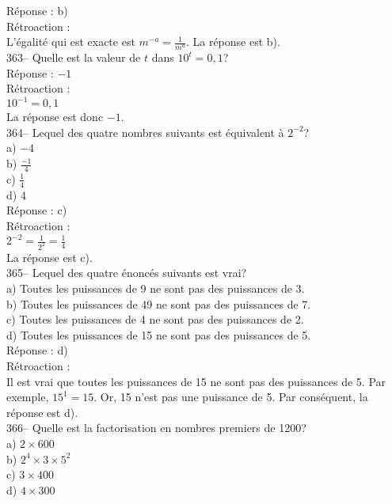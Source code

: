 ﻿\documentclass[letterpaper, 12pt]{article}
\begin{document}
R\'eponse : b)\\

R\'etroaction : \\
L'\'egalit\'e qui est exacte est $m^{-a}=\frac{1}{m^{a}}$.  La r\'eponse est
b).\\

363-- Quelle est la valeur de $t$ dans $10^{t}=0,1$?\\

R\'eponse : $-1$\\

R\'etroaction : \\
$10^{-1}=0,1$\\
La r\'eponse est donc $-1$.\\

364-- Lequel des quatre nombres suivants est \'equivalent \`a $2^{-2}$?\\
a) $-4$\\[2mm]
b) $\frac{-1}{4}$\\[2mm]
c) $\frac{1}{4}$\\[2mm]
d) 4\\

R\'eponse : c)\\

R\'etroaction : \\
$2^{-2}=\frac{1}{2^{2}}=\frac{1}{4}$\\[2mm]
La r\'eponse est c).\\

365-- Lequel des quatre \'enonc\'es suivants est vrai?\\
a) Toutes les puissances de 9 ne sont pas des puissances de 3.\\
b) Toutes les puissances de 49 ne sont pas des puissances de 7.\\
c) Toutes les puissances de 4 ne sont pas des puissances de 2.\\
d) Toutes les puissances de 15 ne sont pas des puissances de 5.\\

R\'eponse : d)\\

R\'etroaction : \\
Il est vrai que toutes les puissances de 15 ne sont pas des puissances de 5.
  Par exemple, $15^{1}=15$. Or, 15 n'est pas une puissance de 5.  Par
cons\'equent, la r\'eponse est d).\\

366-- Quelle est la factorisation en nombres premiers de 1200?\\
a) $2\times600$\\
b) $2^{4}\times3\times5^{2}$\\
c) $3\times 400$\\
d) $4\times300$\\
\end{document}
